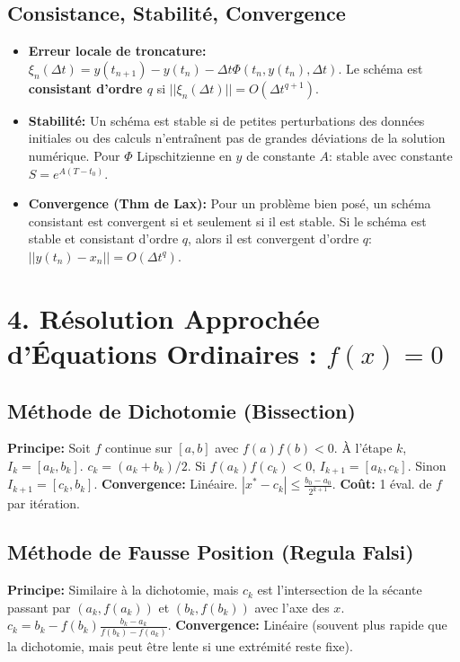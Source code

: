 \documentclass[10pt,a4paper]{article}
\newcommand{\EO}{\text{(EO)}}
\begin{document}
\subsection*{Consistance, Stabilité, Convergence}
\begin{itemize}
    \item \textbf{Erreur locale de troncature:} $\xi_n(\Delta t) = y(t_{n+1}) - y(t_n) - \Delta t \Phi(t_n, y(t_n), \Delta t)$.
    Le schéma est \textbf{consistant d'ordre $q$} si $||\xi_n(\Delta t)|| = O(\Delta t^{q+1})$.
    \item \textbf{Stabilité:} Un schéma est stable si de petites perturbations des données initiales ou des calculs n'entraînent pas de grandes déviations de la solution numérique.
    Pour $\Phi$ Lipschitzienne en $y$ de constante $A$: stable avec constante $S=e^{A(T-t_0)}$.
    \item \textbf{Convergence (Thm de Lax):} Pour un problème bien posé, un schéma consistant est convergent si et seulement si il est stable.
    Si le schéma est stable et consistant d'ordre $q$, alors il est convergent d'ordre $q$: $||y(t_n) - x_n|| = O(\Delta t^q)$.
\end{itemize}

\newpage
\section*{4. Résolution Approchée d'Équations Ordinaires \EO: $f(x)=0$}

\subsection*{Méthode de Dichotomie (Bissection)}
\textbf{Principe:} Soit $f$ continue sur $[a,b]$ avec $f(a)f(b)<0$.
À l'étape $k$, $I_k = [a_k, b_k]$. $c_k = (a_k+b_k)/2$.
Si $f(a_k)f(c_k)<0$, $I_{k+1}=[a_k, c_k]$. Sinon $I_{k+1}=[c_k, b_k]$.
\textbf{Convergence:} Linéaire. $|x^* - c_k| \le \frac{b_0-a_0}{2^{k+1}}$.
\textbf{Coût:} 1 éval. de $f$ par itération.

\subsection*{Méthode de Fausse Position (Regula Falsi)}
\textbf{Principe:} Similaire à la dichotomie, mais $c_k$ est l'intersection de la sécante passant par $(a_k, f(a_k))$ et $(b_k, f(b_k))$ avec l'axe des $x$.
$c_k = b_k - f(b_k) \frac{b_k-a_k}{f(b_k)-f(a_k)}$.
\textbf{Convergence:} Linéaire (souvent plus rapide que la dichotomie, mais peut être lente si une extrémité reste fixe).
\end{document}
